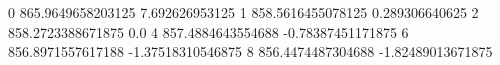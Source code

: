 0 865.9649658203125 7.692626953125
1 858.5616455078125 0.289306640625
2 858.2723388671875 0.0
4 857.4884643554688 -0.78387451171875
6 856.8971557617188 -1.37518310546875
8 856.4474487304688 -1.82489013671875
